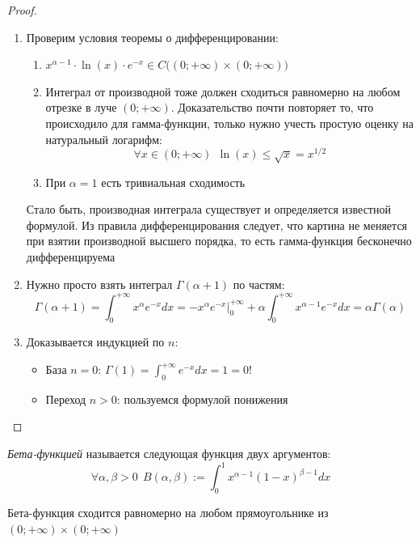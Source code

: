 \begin{proof}~
	\begin{enumerate}
		\item Проверим условия теоремы о дифференцировании:
		\begin{enumerate}
			\item $x^{\alpha - 1} \cdot \ln(x) \cdot e^{-x} \in C\big((0; +\infty) \times (0; +\infty)\big)$
			
			\item Интеграл от производной тоже должен сходиться равномерно на любом отрезке в луче $(0; +\infty)$. Доказательство почти повторяет то, что происходило для гамма-функции, только нужно учесть простую оценку на натуральный логарифм:
			\[
				\forall x \in (0; +\infty)\ \ \ln(x) \le \sqrt{x} = x^{1 / 2}
			\]
			
			\item При $\alpha = 1$ есть тривиальная сходимость
		\end{enumerate}
		Стало быть, производная интеграла существует и определяется известной формулой. Из правила дифференцирования следует, что картина не меняется при взятии производной высшего порядка, то есть гамма-функция бесконечно дифференцируема
		
		\item Нужно просто взять интеграл $\Gamma(\alpha + 1)$ по частям:
		\[
			\Gamma(\alpha + 1) = \int_0^{+\infty} x^\alpha e^{-x}dx = -x^\alpha e^{-x}\Big|_0^{+\infty} + \alpha \int_0^{+\infty} x^{\alpha - 1}e^{-x}dx = \alpha\Gamma(\alpha)
		\]
		
		\item Доказывается индукцией по $n$:
		\begin{itemize}
			\item База $n = 0$: $\Gamma(1) = \int_0^{+\infty} e^{-x}dx = 1 = 0!$
			
			\item Переход $n > 0$: пользуемся формулой понижения
		\end{itemize}
	\end{enumerate}
\end{proof}

\begin{definition}
	\textit{Бета-функцией} называется следующая функция двух аргументов:
	\[
		\forall \alpha, \beta > 0\ \ B(\alpha, \beta) := \int_0^1 x^{\alpha - 1}(1 - x)^{\beta - 1}dx
	\]
\end{definition}

\begin{proposition}
	Бета-функция сходится равномерно на любом прямоугольнике из $(0; +\infty) \times (0; +\infty)$
\end{proposition}

